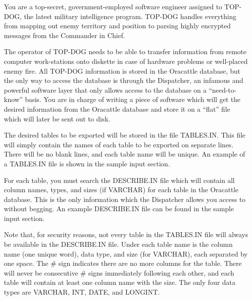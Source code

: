 


\pagestyle{contest}


\maketitle


You are a top-secret, government-employed software engineer assigned
to TOP-DOG, the latest military intelligence program.  TOP-DOG handles
everything from mapping out enemy territory and position to parsing
highly encrypted messages from the Commander in Chief.

The operator of TOP-DOG needs to be able to transfer information from
remote computer work-stations onto diskette in case of hardware
problems or well-placed enemy fire.  All TOP-DOG information is stored
in the Oracattle database, but the only way to access the database is
through the Dispatcher, an infamous and powerful software layer that
only allows access to the database on a ``need-to-know'' basis.  You
are in charge of writing a piece of software which will get the
desired information from the Oracattle database and store it on a
``flat'' file which will later be sent out to disk.

\bigskip
{}

The desired tables to be exported will be stored in the file
TABLES.IN.  This file will simply contain the names of each table to
be exported on separate lines.  There will be no blank lines, and each
table name will be unique.  An example of a TABLES.IN file is shown in
the sample input section.

For each table, you must search the DESCRIBE.IN file which will
contain all column names, types, and sizes (if VARCHAR) for each table
in the Oracattle database.  This is the only information which the
Dispatcher allows you access to without begging.  An example
DESCRIBE.IN file can be found in the sample input section.

Note that, for security reasons, not every table in the TABLES.IN file
will always be available in the DESCRIBE.IN file.  Under each table
name is the column name (one unique word), data type, and size (for
VARCHAR), each separated by one space.  The \# sign indicates there
are no more columns for the table.  There will never be consecutive \#
signs immediately following each other, and each table will contain at
least one column name with the size.  The only four data types are
VARCHAR, INT, DATE, and LONGINT.

